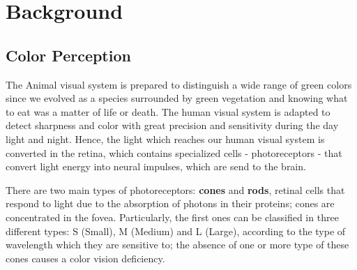 
\section{Background}
\label{sec:background}

\subsection{Color Perception}
%
The Animal visual system is prepared to distinguish a wide range of green colors since we evolved as a species
surrounded by green vegetation and knowing what to eat was a matter of life or death. The human visual system
is adapted to detect sharpness and color with great precision and sensitivity during the day light and night.
Hence, the light which reaches our human visual system is converted in the retina, which contains specialized
cells - photoreceptors - that convert light energy into neural impulses, which are send to the brain. \par
%
There are two main types of photoreceptors: \textbf{cones} and \textbf{rods}, retinal cells that respond to light
due to the absorption of photons in their proteins; cones are concentrated in the fovea. Particularly, the
first ones can be classified in three different types: S (Small), M (Medium) and L (Large), according to the
type of wavelength which they are sensitive to; the absence of one or more type of these cones causes a color
vision deficiency.
%
